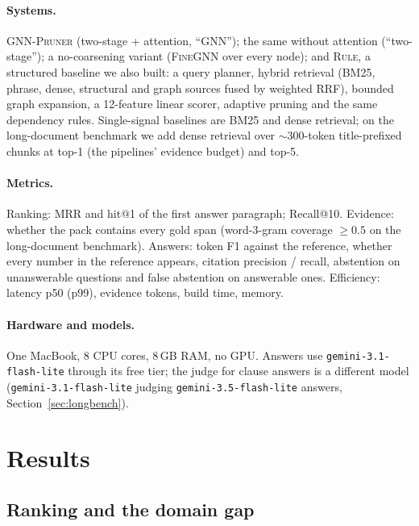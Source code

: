 \documentclass[11pt]{article}
\newcommand{\system}{\textsc{GNN-Pruner}}
\newcommand{\fine}{\textsc{FineGNN}}
\newcommand{\rulepipe}{\textsc{Rule}}
\begin{document}
\paragraph{Systems.} \system{} (two-stage + attention, ``GNN''); the same without attention (``two-stage''); a no-coarsening variant (\fine{} over every node); and \rulepipe{}, a structured baseline we also built: a query planner, hybrid retrieval (BM25, phrase, dense, structural and graph sources fused by weighted RRF), bounded graph expansion, a 12-feature linear scorer, adaptive pruning and the same dependency rules. Single-signal baselines are BM25 and dense retrieval; on the long-document benchmark we add dense retrieval over $\sim$300-token title-prefixed chunks at top-1 (the pipelines' evidence budget) and top-5.

\paragraph{Metrics.} Ranking: MRR and hit@1 of the first answer paragraph; Recall@10. Evidence: whether the pack contains every gold span (word-3-gram coverage $\geq 0.5$ on the long-document benchmark). Answers: token F1 against the reference, whether every number in the reference appears, citation precision / recall, abstention on unanswerable questions and false abstention on answerable ones. Efficiency: latency p50 (p99), evidence tokens, build time, memory.

\paragraph{Hardware and models.} One MacBook, 8 CPU cores, 8\,GB RAM, no GPU. Answers use \texttt{gemini-3.1-flash-lite} through its free tier; the judge for clause answers is a different model \citep{zheng2023judge} (\texttt{gemini-3.1-flash-lite} judging \texttt{gemini-3.5-flash-lite} answers, Section~\ref{sec:longbench}).

\section{Results}

\subsection{Ranking and the domain gap}
\end{document}
